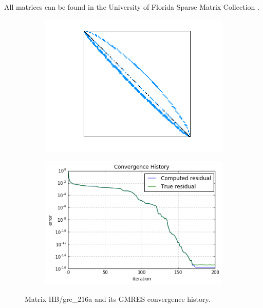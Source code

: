 All matrices can be found in the University of Florida Sparse Matrix Collection \cite{Davis:2011:UFS:2049662.2049663}.
\begin{figure}[h]
	\centering
	\begin{subfigure}[t]{0.45\linewidth}
		\centering
		\includegraphics[width=1.1\linewidth]{figures/gre_216a/matrix.png}
		\caption{}		
	\end{subfigure}
	\quad
	\begin{subfigure}[t]{0.45\linewidth}
		\centering
		\includegraphics[width=1.15\linewidth]{figures/gre_216a/convergence_history.png}
		\caption{}
	\end{subfigure}
	\caption{Matrix HB/gre_216a and its GMRES convergence history.}\label{fig:gre_216a}
\end{figure}
